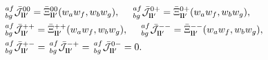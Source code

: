 \documentclass[a4paper,11pt]{article}
\begin{document}
        \begin{align}\label{eq:coeff_cmcm_flat}
          &\,^{af}_{bg}\bar{\mathcal{J}}^{00}_{{\bf l}{\bf l}'}=\bar{\Xi}^{00}_{{\bf l}{\bf l}'}(w_aw_f,w_bw_g),\hspace{12pt}
           \,^{af}_{bg}\bar{\mathcal{J}}^{0+}_{{\bf l}{\bf l}'}=\bar{\Xi}^{0+}_{{\bf l}{\bf l}'}(w_aw_f,w_bw_g),\\
          &\,^{af}_{bg}\bar{\mathcal{J}}^{++}_{{\bf l}{\bf l}'}=\bar{\Xi}^{++}_{{\bf l}{\bf l}'}(w_aw_f,w_bw_g),\hspace{12pt}
           \,^{af}_{bg}\bar{\mathcal{J}}^{--}_{{\bf l}{\bf l}'}=\bar{\Xi}^{--}_{{\bf l}{\bf l}'}(w_aw_f,w_bw_g),\\
          &\,^{af}_{bg}\bar{\mathcal{J}}^{+-}_{{\bf l}{\bf l}'}=
           \,^{af}_{bg}\bar{\mathcal{J}}^{-+}_{{\bf l}{\bf l}'}=
           \,^{af}_{bg}\bar{\mathcal{J}}^{0-}_{{\bf l}{\bf l}'}=0.
        \end{align}
        
\end{document}
